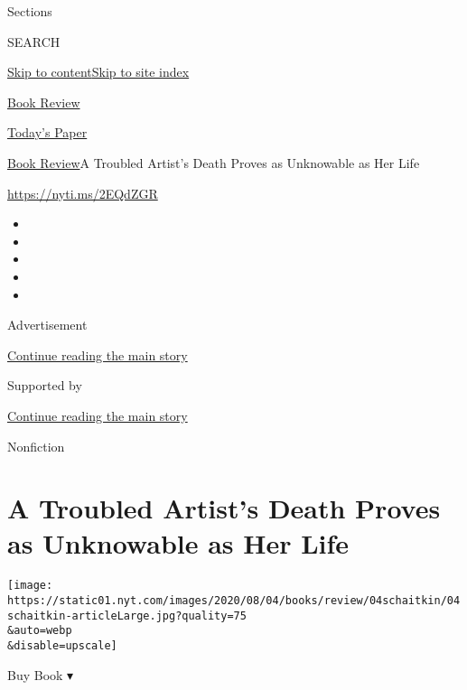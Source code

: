 Sections

SEARCH

\protect\hyperlink{site-content}{Skip to
content}\protect\hyperlink{site-index}{Skip to site index}

\href{https://www.nytimes.com/section/books/review}{Book Review}

\href{https://myaccount.nytimes.com/auth/login?response_type=cookie\&client_id=vi}{}

\href{https://www.nytimes.com/section/todayspaper}{Today's Paper}

\href{/section/books/review}{Book Review}\textbar{}A Troubled Artist's
Death Proves as Unknowable as Her Life

\url{https://nyti.ms/2EQdZGR}

\begin{itemize}
\item
\item
\item
\item
\item
\end{itemize}

Advertisement

\protect\hyperlink{after-top}{Continue reading the main story}

Supported by

\protect\hyperlink{after-sponsor}{Continue reading the main story}

Nonfiction

\hypertarget{a-troubled-artists-death-proves-as-unknowable-as-her-life}{%
\section{A Troubled Artist's Death Proves as Unknowable as Her
Life}\label{a-troubled-artists-death-proves-as-unknowable-as-her-life}}

\texttt{[image: https://static01.nyt.com/images/2020/08/04/books/review/04schaitkin/04schaitkin-articleLarge.jpg?quality=75\\\&auto=webp\\\&disable=upscale]}

Buy Book ▾

